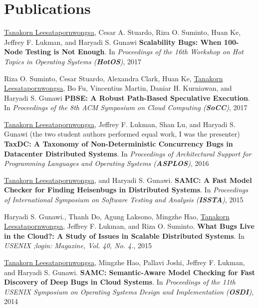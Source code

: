 \documentclass[10pt]{article} %
\begin{document}

\section{Publications}

\underline{Tanakorn Leesatapornwongsa}, Cesar A. Stuardo, Riza O. Suminto, Huan Ke, 
Jeffrey F. Lukman, and Haryadi S. Gunawi \textbf{Scalability Bugs: When 100-Node
Testing is Not Enough}. In \textit{Proceedings of the 16th Workshop on Hot Topics
in Operating Systems (\textbf{HotOS})}, 2017 
\vspace{2mm}

Riza O. Suminto, Cesar Stuardo, Alexandra Clark, Huan Ke, \underline{Tanakorn
Leesatapornwongsa}, Bo Fu, Vincentius Martin, Daniar H. Kurniawan, and Haryadi
S. Gunawi \textbf{PBSE: A Robust Path-Based Speculative Execution}. In
\textit{Proceedings of the 8th ACM Symposium on Cloud Computing
(\textbf{SoCC})}, 2017
\vspace{2mm}

\underline{Tanakorn Leesatapornwongsa}, Jeffrey F. Lukman, Shan Lu, and Haryadi
S. Gunawi (the two student authors performed equal work, I was the presenter)
\textbf{TaxDC: A Taxonomy of Non-Deterministic Concurrency Bugs in Datacenter
Distributed Systems}. In \textit{Proceedings of Architectural Support for
Programming Languages and Operating Systems (\textbf{ASPLOS})}, 2016 
\vspace{2mm}

\underline{Tanakorn Leesatapornwongsa}, and Haryadi S. Gunawi. \textbf{SAMC: A
Fast Model Checker for Finding Heisenbugs in Distributed Systems}. In
\textit{Proceedings of International Symposium on Software Testing and Analysis
(\textbf{ISSTA})}, 2015
\vspace{2mm}

Haryadi S. Gunawi., Thanh Do, Agung Laksono, Mingzhe Hao, \underline{Tanakorn
Leesatapornwongsa}, Jeffrey F. Lukman, and Riza O. Suminto.  \textbf{What Bugs
Live in the Cloud?: A Study of Issues in Scalable Distributed Systems}. In
\textit{USENIX ;login: Magazine, Vol. 40, No. 4.}, 2015 
\vspace{2mm}

\underline{Tanakorn Leesatapornwongsa}, Mingzhe Hao, Pallavi Joshi, Jeffrey F.
Lukman, and Haryadi S. Gunawi. \textbf{SAMC: Semantic-Aware Model Checking for
Fast Discovery of Deep Bugs in Cloud Systems}. In \textit{Proceedings of the
11th USENIX Symposium on Operating Systems Design and Implementation (\textbf{OSDI})},
2014
\vspace{2mm}
\end{document}
